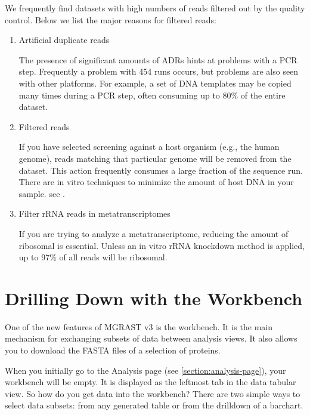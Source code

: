 \documentclass[12pt,fullpage]{report}
\begin{document}
We frequently find datasets with high numbers of reads filtered out by the quality control. Below we list the major reasons for filtered reads:

\begin{enumerate}
\item Artificial duplicate reads 

The presence of significant amounts of ADRs hints at problems with a PCR step. Frequently a problem with 454 runs occurs, but problems are also seen with other platforms. For example, a set of DNA templates may be  copied many times during a PCR step, often consuming up to 80\% of the entire dataset.

\item Filtered reads

If you have selected screening against a host organism (e.g., the human genome), reads matching that particular genome will be removed from the dataset. This action frequently consumes a large fraction of the sequence run. There are in vitro techniques to minimize the amount of host DNA in your sample. see \cite{THOMASREVIEW}.

\item Filter rRNA reads in metatranscriptomes

If you are trying to analyze a metatranscriptome, reducing the amount of ribosomal is essential. Unless an in vitro rRNA knockdown method is applied, up to 97\% of all reads will be ribosomal.

\end{enumerate}


\section{Drilling Down with the Workbench}

One of the new features of MGRAST v3 is the workbench. It is the main mechanism for exchanging subsets of data between analysis views. It also allows you to download the FASTA files of a selection of proteins.

When you initially go to the Analysis page (see \ref{section:analysis-page}), your workbench will be empty. It is displayed as the leftmost tab in the data tabular view. So how do you get data into the workbench? There are two simple ways to select data subsets: from any generated table or from the drilldown of a barchart.
\end{document}
